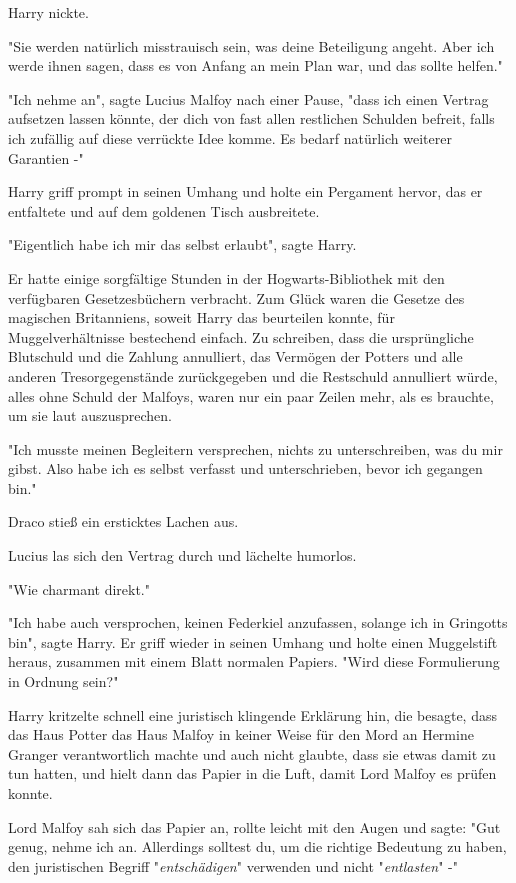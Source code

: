 {Harry nickte.

"Sie werden natürlich misstrauisch sein, was deine Beteiligung angeht. Aber ich werde ihnen sagen, dass es von Anfang an mein Plan war, und das sollte helfen."

"Ich nehme an", sagte Lucius Malfoy nach einer Pause, "dass ich einen Vertrag aufsetzen lassen könnte, der dich von fast allen restlichen Schulden befreit, falls ich zufällig auf diese verrückte Idee komme. Es bedarf natürlich weiterer Garantien -"

Harry griff prompt in seinen Umhang und holte ein Pergament hervor, das er entfaltete und auf dem goldenen Tisch ausbreitete.

"Eigentlich habe ich mir das selbst erlaubt", sagte Harry.

Er hatte einige sorgfältige Stunden in der Hogwarts-Bibliothek mit den verfügbaren Gesetzesbüchern verbracht. Zum Glück waren die Gesetze des magischen Britanniens, soweit Harry das beurteilen konnte, für Muggelverhältnisse bestechend einfach. Zu schreiben, dass die ursprüngliche Blutschuld und die Zahlung annulliert, das Vermögen der Potters und alle anderen Tresorgegenstände zurückgegeben und die Restschuld annulliert würde, alles ohne Schuld der Malfoys, waren nur ein paar Zeilen mehr, als es brauchte, um sie laut auszusprechen.

"Ich musste meinen Begleitern versprechen, nichts zu unterschreiben, was du mir gibst. Also habe ich es selbst verfasst und unterschrieben, bevor ich gegangen bin."

Draco stieß ein ersticktes Lachen aus.

Lucius las sich den Vertrag durch und lächelte humorlos.

"Wie charmant direkt."

"Ich habe auch versprochen, keinen Federkiel anzufassen, solange ich in Gringotts bin", sagte Harry. Er griff wieder in seinen Umhang und holte einen Muggelstift heraus, zusammen mit einem Blatt normalen Papiers. "Wird diese Formulierung in Ordnung sein?"

Harry kritzelte schnell eine juristisch klingende Erklärung hin, die besagte, dass das Haus Potter das Haus Malfoy in keiner Weise für den Mord an Hermine Granger verantwortlich machte und auch nicht glaubte, dass sie etwas damit zu tun hatten, und hielt dann das Papier in die Luft, damit Lord Malfoy es prüfen konnte.

Lord Malfoy sah sich das Papier an, rollte leicht mit den Augen und sagte: "Gut genug, nehme ich an. Allerdings solltest du, um die richtige Bedeutung zu haben, den juristischen Begriff "\emph{entschädigen}" verwenden und nicht "\emph{entlasten}" -"

}
